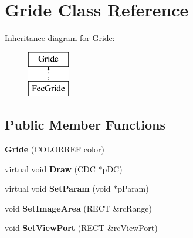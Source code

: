 \hypertarget{class_gride}{}\section{Gride Class Reference}
\label{class_gride}
Inheritance diagram for Gride\+:\begin{figure}[H]
\begin{center}
\leavevmode
\includegraphics[height=2.000000cm]{class_gride}
\end{center}
\end{figure}
\subsection*{Public Member Functions}
\begin{DoxyCompactItemize}
\item 
\mbox{\label{class_gride_a5191e375eefed134243a36b19cc29e4b}} 
{\bfseries Gride} (C\+O\+L\+O\+R\+R\+EF color)
\item 
\mbox{\label{class_gride_a437b35e279bbe1639c8375e9cf8f5e83}} 
virtual void {\bfseries Draw} (C\+DC $\ast$p\+DC)
\item 
\mbox{\label{class_gride_af033f138fd823c16846699d4722e0d86}} 
virtual void {\bfseries Set\+Param} (void $\ast$p\+Param)
\item 
\mbox{\label{class_gride_a8bf37bf5afa6de5bc022ed049fec6eab}} 
void {\bfseries Set\+Image\+Area} (R\+E\+CT \&rc\+Range)
\item 
\mbox{\label{class_gride_a06e001fe22bd5702315fc1d710dc5f16}} 
void {\bfseries Set\+View\+Port} (R\+E\+CT \&rc\+View\+Port)
\end{DoxyCompactItemize}
